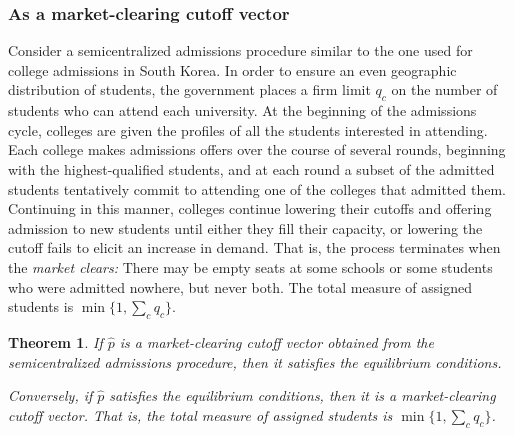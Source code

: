 \documentclass[12pt]{article}
\newtheorem{theorem}{Theorem}
\theoremstyle{definition}
\begin{document}
\subsubsection{As a market-clearing cutoff vector}
Consider a semicentralized admissions procedure similar to the one used for college admissions in South Korea. In order to ensure an even geographic distribution of students, the government places a firm limit $q_c$ on the number of students who can attend each university. At the beginning of the admissions cycle, colleges are given the profiles of all the students interested in attending. Each college makes admissions offers over the course of several rounds, beginning with the highest-qualified students, and at each round a subset of the admitted students tentatively commit to attending one of the colleges that admitted them. Continuing in this manner, colleges continue lowering their cutoffs and offering admission to new students until either they fill their capacity, or lowering the cutoff fails to elicit an increase in demand. That is, the process terminates when the \emph{market clears:} There may be empty seats at some schools or some students who were admitted nowhere, but never both. The total measure of assigned students is $\min\{1, \sum_c q_c\}$.

\begin{theorem}
If $\hat p$ is a market-clearing cutoff vector obtained from the semicentralized admissions procedure, then it satisfies the equilibrium conditions.

Conversely, if $\hat p$ satisfies the equilibrium conditions, then it is a market-clearing cutoff vector. That is, the total measure of assigned students is $\min\{1, \sum_c q_c\}$. 
\end{theorem}
\end{document}
